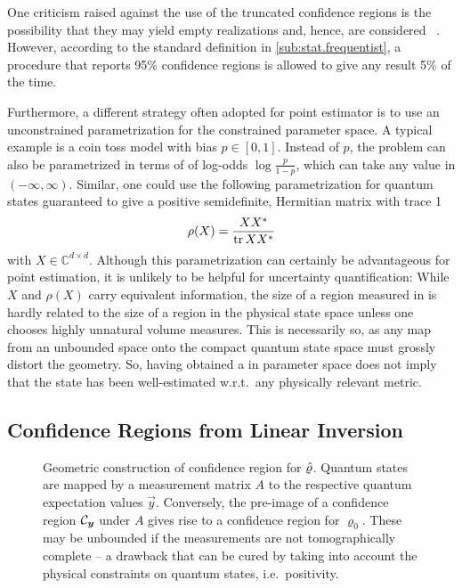One criticism raised against the use of the truncated confidence regions is the possibility that they may yield empty realizations and, hence, are considered ~\cite{Feldman_1998_Unified}.
However, according to the standard definition in \cref{sub:stat.frequentist}, a procedure that reports 95\% confidence regions is allowed to give any result 5\% of the time.

Furthermore, a different strategy often adopted for point estimator is to use an unconstrained parametrization for the constrained parameter space.
A typical example is a coin toss model with bias $p \in [0, 1]$.
Instead of $p$, the problem can also be parametrized in terms of of log-odds $\log\frac{p}{1 - p}$, which can take any value in $(-\infty,\infty)$.
Similar, one could use the following parametrization for quantum states guaranteed to give a positive semidefinite, Hermitian matrix with trace 1
\[
  \rho(X) = \frac{X {{X}^\ast}}{\operatorname{tr} X {{X}^\ast}}
\]
with $X \in \mathbb{C}^{d \times d}$.
Although this parametrization can certainly be advantageous for point estimation, it is unlikely to be helpful for uncertainty quantification:
While $X$ and $\rho(X)$ carry equivalent information, the size of a region measured in  is hardly related to the size of a region in the physical state space unless one chooses highly unnatural volume measures.
This is necessarily so, as any map from an unbounded space onto the compact quantum state space must grossly distort the geometry.
So, having obtained a  in parameter space does not imply that the state has been well-estimated w.r.t.\ any physically relevant metric.

\subsection{Confidence Regions from Linear Inversion}
\label{sub:ortho.linear_inversion}

\begin{figure*}
  \centering
  \caption{\label{fig:ortho.geometry}%
    Geometric construction of confidence region for $\hat{\varrho}$.
    Quantum states are mapped by a measurement matrix $A$ to the respective quantum expectation values $\vec y$.
    Conversely, the pre-image of a confidence region $\mathcal{C}_{\boldsymbol{y}}$ under $A$ gives rise to a confidence region for $\varrho_0$.
    These may be unbounded if the measurements are not tomographically complete -- a drawback that can be cured by taking into account the physical constraints on quantum states, i.e.\ positivity.
  }
\end{figure*}


